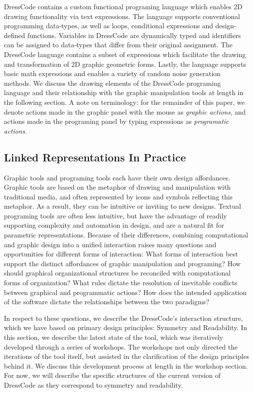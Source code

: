 \documentclass{sigchi}
\begin{document}
 DressCode contains a custom functional programing language which enables 2D drawing functionality via text expressions. The language supports conventional programming data-types, as well as loops, conditional expressions and design-defined functions. Variables in DressCode are dynamically typed and identifiers can be assigned to data-types that differ from their original assignment. The DressCode language contains a subset of expressions which facilitate the drawing and transformation of 2D graphic geometric forms. Lastly, the language supports basic math expressions and enables a variety of random noise generation methods. We discuss the drawing elements of the DressCode programing language and their relationship with the graphic manipulation tools at length in the following section. A note on terminology: for the remainder of this paper, we denote actions made in the graphic panel with the mouse as \textit{graphic actions}, and actions made in the programing panel by typing expressions as \textit{programatic actions}.


\subsection{Linked Representations In Practice}
Graphic tools and programing tools each have their own design affordances. Graphic tools are based on the metaphor of drawing and manipulation with traditional media, and often represented by icons and symbols reflecting this metaphor. As a result, they can be intuitive or inviting to new designs. Textual programing tools are often less intuitive, but have the advantage of readily supporting complexity and automation in design, and are a natural fit for parametric representations. Because of their differences, combining computational and graphic design into a unified interaction raises many questions and opportunities for different forms of interaction: What forms of interaction best support the distinct affordances of graphic manipulation and programing? How should graphical organizational structures be reconciled with computational forms of organization? What rules dictate the resolution of inevitable conflicts between graphical and programmatic actions? How does the intended application of the software dictate the relationships between the two paradigms?

In respect to these questions, we describe the DressCode's interaction structure, which we have based on primary design principles: Symmetry and Readability. In this section, we describe the latest state of the tool, which was iteratively developed through a series of workshops. The workshops not only directed the iterations of the tool itself, but assisted in the clarification of the design principles behind it. We discuss this development process at length in the workshop section. For now, we will describe the specific structures of the current version of DressCode as they correspond to symmetry and readability.
\end{document}
